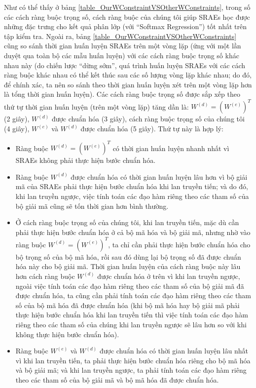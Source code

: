 Như có thể thấy ở bảng \ref{table_OurWConstraintVSOtherWConstraints}, trong số các cách ràng buộc trọng số, cách ràng buộc của chúng tôi giúp SRAEs học được những đặc trưng cho kết quả phân lớp (với ``Softmax Regression'') tốt nhất trên tập kiểm tra. Ngoài ra, bảng \ref{table_OurWConstraintVSOtherWConstraints} cũng so sánh thời gian huấn luyện SRAEs trên một vòng lặp (ứng với một lần duyệt qua toàn bộ các mẫu huấn luyện) với các cách ràng buộc trọng số khác nhau này (do chiến lược ``dừng sớm'', quá trình huấn luyện SRAEs với các cách ràng buộc khác nhau có thể kết thúc sau các số lượng vòng lặp khác nhau; do đó, để chính xác, ta nên so sánh theo thời gian huấn luyện xét trên một vòng lặp hơn là tổng thời gian huấn luyện). Các cách ràng buộc trọng số được sắp xếp theo thứ tự thời gian huấn luyện (trên một vòng lặp) tăng dần là: $W^{(d)} = (W^{(e)})^T$ (2 giây), $W^{(d)}$ được chuẩn hóa (3 giây), cách ràng buộc trọng số của chúng tôi (4 giây), $W^{(e)}$ và $W^{(d)}$ được chuẩn hóa (5 giây). Thứ tự này là hợp lý:
\begin{itemize}
	\item Ràng buộc $W^{(d)} = (W^{(e)})^T$ có thời gian huấn luyện nhanh nhất vì SRAEs không phải thực hiện bước chuẩn hóa.
	\item Ràng buộc $W^{(d)}$ được chuẩn hóa có thời gian huấn luyện lâu hơn vì bộ giải mã của SRAEs phải thực hiện bước chuẩn hóa khi lan truyền tiến; và do đó, khi lan truyền ngược, việc tính toán các đạo hàm riêng theo các tham số của bộ giải mã cũng sẽ tốn thời gian hơn bình thường.
	\item Ở cách ràng buộc trọng số của chúng tôi, khi lan truyền tiến, mặc dù cần phải thực hiện bước chuẩn hóa ở cả bộ mã hóa và bộ giải mã, nhưng nhờ vào ràng buộc $W^{(d)} = (W^{(e)})^T$, ta chỉ cần phải thực hiện bước chuẩn hóa cho bộ trọng số của bộ mã hóa, rồi sau đó dùng lại bộ trọng số đã được chuẩn hóa này cho bộ giải mã. Thời gian huấn luyện của cách ràng buộc này lâu hơn cách ràng buộc $W^{(d)}$ được chuẩn hóa ở trên vì khi lan truyền ngược, ngoài việc tính toán các đạo hàm riêng theo các tham số của bộ giải mã đã được chuẩn hóa, ta cũng cần phải tính toán các đạo hàm riêng theo các tham số của bộ mã hóa đã được chuẩn hóa (khi bộ mã hóa hay bộ giải mã phải thực hiện bước chuẩn hóa khi lan truyền tiến thì việc tính toán các đạo hàm riêng theo các tham số của chúng khi lan truyền ngược sẽ lâu hơn so với khi không thực hiện bước chuẩn hóa).
	\item Ràng buộc $W^{(e)}$ và $W^{(d)}$ được chuẩn hóa có thời gian huấn luyện lâu nhất vì khi lan truyền tiến, ta phải thực hiện bước chuẩn hóa riêng cho bộ mã hóa và bộ giải mã; và khi lan truyền ngược, ta phải tính toán các đạo hàm riêng theo các tham số của bộ giải mã và bộ mã hóa đã được chuẩn hóa.
\end{itemize}
